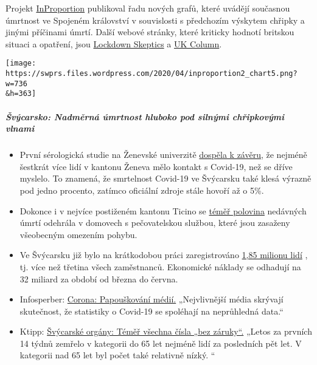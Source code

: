 Projekt \href{http://inproportion2.talkigy.com/}{InProportion}
publikoval řadu nových grafů, které uvádějí současnou úmrtnost ve
Spojeném království v souvislosti s předchozím výskytem chřipky a jinými
příčinami úmrtí. Další webové stránky, které kriticky hodnotí britskou
situaci a opatření, jsou \href{https://lockdownsceptics.org/}{Lockdown
Skeptics} a \href{https://www.ukcolumn.org/}{UK Column}.

\texttt{[image: https://swprs.files.wordpress.com/2020/04/inproportion2\_chart5.png?w=736\\\&h=363]}

\hypertarget{ux161vuxfdcarsko-nadmux11brnuxe1-uxfamrtnost-hluboko-pod-silnuxfdmi-chux159ipkovuxfdmi-vlnami}{%
\subparagraph{\texorpdfstring{\textbf{Švýcarsko: Nadměrná úmrtnost
hluboko pod silnými chřipkovými
vlnami}}{Švýcarsko: Nadměrná úmrtnost hluboko pod silnými chřipkovými vlnami}}\label{ux161vuxfdcarsko-nadmux11brnuxe1-uxfamrtnost-hluboko-pod-silnuxfdmi-chux159ipkovuxfdmi-vlnami}}

\begin{itemize}
\tightlist
\item
  První sérologická studie na Ženevské univerzitě
  \href{https://www.hug-ge.ch/medias/communique-presse/seroprevalence-covid-19-premiere-estimation}{dospěla
  k závěru}, že nejméně šestkrát více lidí v kantonu Ženeva mělo kontakt
  s Covid-19, než se dříve myslelo. To znamená, že smrtelnost Covid-19
  ve Švýcarsku také klesá výrazně pod jedno procento, zatímco oficiální
  zdroje stále hovoří až o 5\%.
\item
  Dokonce i v nejvíce postiženém kantonu Ticino se
  \href{https://www.bluewin.ch/de/news/schweiz/sp-chef-levrat-will-die-reichen-schropfen-383977.html}{téměř
  polovina} nedávných úmrtí odehrála v domovech s pečovatelskou službou,
  které jsou zasaženy všeobecným omezením pohybu.
\item
  Ve Švýcarsku již bylo na krátkodobou práci zaregistrováno
  \href{https://www.bluewin.ch/de/news/schweiz/sp-chef-levrat-will-die-reichen-schropfen-383977.html}{1,85
  milionu lidí} , tj. více než třetina všech zaměstnanců. Ekonomické
  náklady se odhadují na 32 miliard za období od března do června.
\item
  Infosperber:
  \href{https://www.infosperber.ch/Artikel/Medien/Corona-NZZ-deckt-das-Nachplappern-anderer-Medien-auf}{Corona:
  Papouškování médií.} „Nejvlivnější média skrývají skutečnost, že
  statistiky o Covid-19 se spoléhají na neprůhledná data.``
\item
  Ktipp:
  \href{https://www.ktipp.ch/artikel/artikeldetail/bund-fast-alle-zahlen-ohne-gewaehr/}{Švýcarské
  orgány: Téměř všechna čísla „bez záruky``.} „Letos za prvních 14 týdnů
  zemřelo v kategorii do 65 let nejméně lidí za posledních pět let. V
  kategorii nad 65 let byl počet také relativně nízký. ``\\
\end{itemize}


